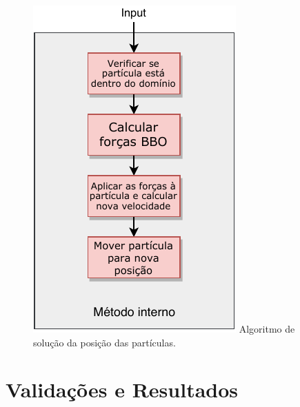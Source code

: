 \documentclass{beamer}
\begin{document}
\begin{frame}
\begin{minipage}{.48\textwidth}
\begin{figure}
{	\includegraphics[height=0.7\textheight]{figure/TCC_Algorithm-Page-3.pdf}
      } {\raggedleft \tiny Algoritmo de solução da posição das partículas.}
    \end{figure}
  \end{minipage}
\end{frame}

\section{Validações e Resultados}
\end{document}
